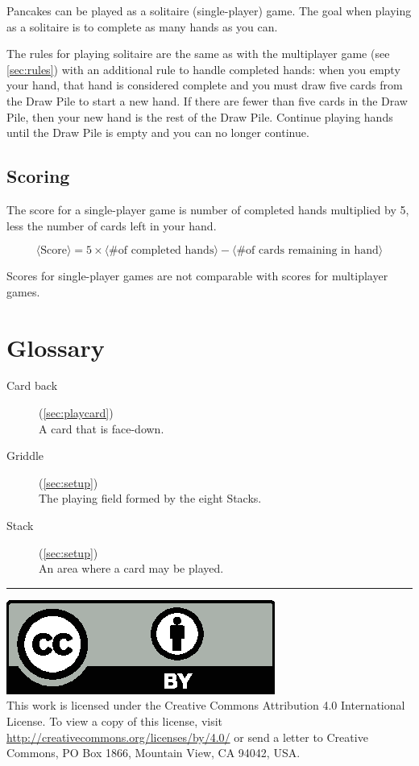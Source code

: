 \documentclass{article}
\begin{document}
Pancakes can be played as a solitaire (single-player) game. The goal when playing as a solitaire is to complete as many hands as you can.

The rules for playing solitaire are the same as with the multiplayer game (see \autoref{sec:rules}) with an additional rule to handle completed hands: when you empty your hand, that hand is considered complete and you must draw five cards from the Draw Pile to start a new hand. If there are fewer than five cards in the Draw Pile, then your new hand is the rest of the Draw Pile. Continue playing hands until the Draw Pile is empty and you can no longer continue.

\subsection{Scoring}

The score for a single-player game is number of completed hands multiplied by 5, less the number of cards left in your hand.

$$
\langle\textrm{Score}\rangle = 5 \times \langle\textrm{\# of completed hands}\rangle - \langle\textrm{\# of cards remaining in hand}\rangle
$$

Scores for single-player games are not comparable with scores for multiplayer games.

\section{Glossary}
\begin{description}
  \item[Card back] (\autoref{sec:playcard})\\
    A card that is face-down.
  \item[Griddle] (\autoref{sec:setup})\\
    The playing field formed by the eight Stacks.
  \item[Stack] (\autoref{sec:setup})\\
    An area where a card may be played.
\end{description}

\medskip
\hrule

{
  \small
  \includegraphics[scale=0.5]{cc-by.eps}\\
  This work is licensed under the Creative Commons Attribution 4.0
  International License. To view a copy of this license, visit
  \url{http://creativecommons.org/licenses/by/4.0/} or send a letter to Creative Commons, PO Box 1866, Mountain View, CA 94042, USA.
}
\end{document}
